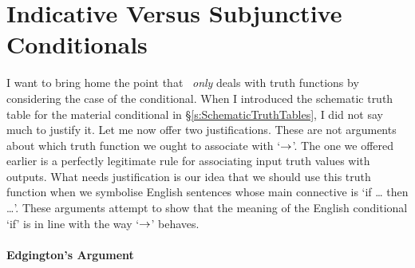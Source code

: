 \section{Indicative Versus Subjunctive Conditionals}\label{s:IndicativeSubjunctive}
I want to bring home the point that \TFL\ \emph{only} deals with truth functions by considering the case of the conditional. When I introduced the schematic truth table for the material conditional in §\ref{s:SchematicTruthTables}, I did not say much to justify it. Let me now offer two justifications. These are not arguments about which truth function we ought to associate with `$\rightarrow$'. The one we offered earlier is a perfectly legitimate rule for associating input truth values with outputs. What needs justification is our idea that we should use this truth function when we symbolise English sentences whose main connective is `if … then …'. These arguments attempt to show that the meaning of the English conditional `if' is in line with the way `$\rightarrow$' behaves.

\paragraph{Edgington's Argument}

